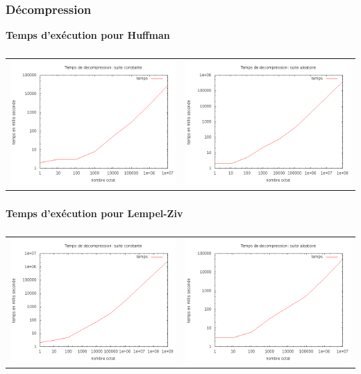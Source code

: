 \documentclass{report}
\begin{document}
\subsubsection*{Décompression}
\textbf{Temps d’exécution pour Huffman}
\subparagraph*{}
\hspace{-2cm}\begin{tabular}{l | l}
\includegraphics[width=7cm]{tempsDhC.png} & 
\includegraphics[width=7cm]{tempsDhA.png}
\end{tabular}
\subparagraph*{}


\paragraph*{}
\textbf{Temps d’exécution pour Lempel-Ziv}
\subparagraph*{}
\hspace{-2cm}\begin{tabular}{l | l}
\includegraphics[width=7cm]{tempsDlzC.png} & 
\includegraphics[width=7cm]{tempsDlzA.png}
\end{tabular}
\subparagraph*{}
\end{document}
